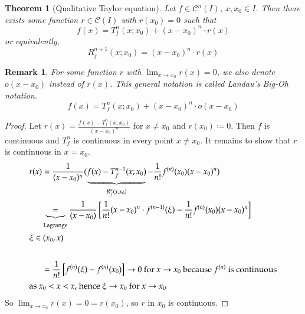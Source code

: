 \documentclass{article}
\newtheorem{theorem}{Theorem}  \numberwithin{theorem}{section}
\newtheorem{remark}{Remark}  \numberwithin{remark}{section}
\begin{document}
\begin{theorem}[Qualitative Taylor equation]
  Let $f \in \mathcal C^n(I)$, $x, x_0 \in I$. Then there exists some function $r \in \mathcal C(I)$ with $r(x_0) = 0$ such that
  \[ f(x) = T_f^n(x; x_0) + (x - x_0)^n \cdot r(x) \]
  or equivalently,
  \[ R_f^{n+1}(x; x_0) = (x - x_0)^n \cdot r(x) \]
\end{theorem}

\begin{remark}
  For some function $r$ with $\lim_{x\to x_0} r(x) = 0$, we also denote $o(x - x_0)$ instead of $r(x)$.
  This general notation is called Landau's Big-Oh notation.
  \[ f(x) = T_f^n(x; x_0) + (x - x_0)^n \cdot o(x - x_0) \]
\end{remark}

\begin{proof}
  Let $r(x) = \frac{f(x) - T_f^n(x; x_0)}{(x - x_0)^n}$ for $x \neq x_0$ and $r(x_0) \coloneqq 0$.
  Then $f$ is continuous and $T_f^n$ is continuous in every point $x \neq x_0$.
  It remains to show that $r$ is continuous in $x = x_0$.
  \begin{align*}
    r(x) &= \frac{1}{(x - x_0)^n} (\underbrace{f(x) - T_f^{n-1}(x; x_0)}_{R_f^n(x; x_0)} - \frac1{n!} f^{(n)}(x_0)(x - x_0)^n) \\
      &\underbrace{=}_{\text{Lagrange}} \frac{1}{(x - x_0)} \left[ \frac{1}{n!} (x - x_0)^n \cdot f^{(n-1)}(\xi) - \frac{1}{n!} f^{(n)}(x_0)(x - x_0)^n \right] \\
    \intertext{$\xi \in (x_0, x)$} \\
      &= \frac{1}{n!} \left[f^{(n)}(\xi) - f^{(n)}(x_0)\right] \to 0 \text{ for } x \to x_0 \text{ because } f^{(n)} \text{ is continuous} \\
    \intertext{as $x_0 < x < x$, hence $\xi \to x_0$ for $x \to x_0$} 
  \end{align*}
  So $\lim_{x\to x_0} r(x) = 0 = r(x_0)$, so $r$ in $x_0$ is continuous.
\end{proof}

\printindex
\end{document}
